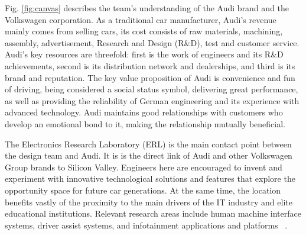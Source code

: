 Fig. \ref{fig:canvas} describes the team's understanding of the Audi brand and the Volkswagen corporation. As a traditional car manufacturer, Audi's revenue mainly comes from selling cars, its cost consists of raw materials, machining, assembly, advertisement, Research and Design (R\&D), test and customer service. Audi's key resources are threefold: first is the work of engineers and its R\&D achievements, second is its distribution network and dealerships, and third is its brand and reputation. The key value proposition of Audi is convenience and fun of driving, being considered a social status symbol, delivering great performance, as well as providing the reliability of German engineering and its experience with advanced technology.
Audi maintains good relationships with customers who develop an emotional bond to it, making the relationship mutually beneficial.



The Electronics Research Laboratory (ERL) is the main contact point between the design team and Audi. It is is the direct link of Audi and other Volkswagen Group brands to Silicon Valley. Engineers here are encouraged to invent and experiment with innovative technological solutions and features that explore the opportunity space for future car generations. At the same time, the location benefits vastly of the proximity to the main drivers of the IT industry and elite educational institutions. Relevant research areas include human machine interface systems, driver assist systems, and infotainment applications and platforms ~\cite{Audi2012December}.

